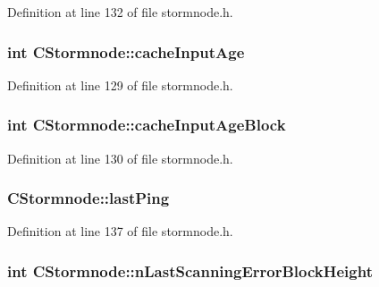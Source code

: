 Definition at line 132 of file stormnode.\+h.

\hypertarget{class_c_stormnode_a60687ff2b6a277680c6d39eeee997532}{}
\subsubsection[{cache\+Input\+Age}]{\setlength{\rightskip}{0pt plus 5cm}int C\+Stormnode\+::cache\+Input\+Age}\label{class_c_stormnode_a60687ff2b6a277680c6d39eeee997532}


Definition at line 129 of file stormnode.\+h.

\hypertarget{class_c_stormnode_a80c11846fa792eb8466a37881b0c4954}{}
\subsubsection[{cache\+Input\+Age\+Block}]{\setlength{\rightskip}{0pt plus 5cm}int C\+Stormnode\+::cache\+Input\+Age\+Block}\label{class_c_stormnode_a80c11846fa792eb8466a37881b0c4954}


Definition at line 130 of file stormnode.\+h.

\hypertarget{class_c_stormnode_a506923ff67bd06fefba3a897828ce892}{}
\subsubsection[{last\+Ping}]{ C\+Stormnode\+::last\+Ping}\label{class_c_stormnode_a506923ff67bd06fefba3a897828ce892}


Definition at line 137 of file stormnode.\+h.

\hypertarget{class_c_stormnode_a632651553ac07fe57ceea55049eb430f}{}
\subsubsection[{n\+Last\+Scanning\+Error\+Block\+Height}]{\setlength{\rightskip}{0pt plus 5cm}int C\+Stormnode\+::n\+Last\+Scanning\+Error\+Block\+Height}\label{class_c_stormnode_a632651553ac07fe57ceea55049eb430f}


